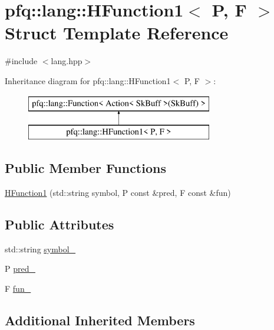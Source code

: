 \hypertarget{structpfq_1_1lang_1_1HFunction1}{\section{pfq\+:\+:lang\+:\+:H\+Function1$<$ P, F $>$ Struct Template Reference}
\label{structpfq_1_1lang_1_1HFunction1}
}


{\ttfamily \#include $<$lang.\+hpp$>$}

Inheritance diagram for pfq\+:\+:lang\+:\+:H\+Function1$<$ P, F $>$\+:\begin{figure}[H]
\begin{center}
\leavevmode
\includegraphics[height=2.000000cm]{structpfq_1_1lang_1_1HFunction1}
\end{center}
\end{figure}
\subsection*{Public Member Functions}
\begin{DoxyCompactItemize}
\item 
\hyperlink{structpfq_1_1lang_1_1HFunction1_aad645822e3a79a69665cd33c663c038d}{H\+Function1} (std\+::string symbol, P const \&pred, F const \&fun)
\end{DoxyCompactItemize}
\subsection*{Public Attributes}
\begin{DoxyCompactItemize}
\item 
std\+::string \hyperlink{structpfq_1_1lang_1_1HFunction1_a4e934ec3ab5d867ade09b56bfd81b2ab}{symbol\+\_\+}
\item 
P \hyperlink{structpfq_1_1lang_1_1HFunction1_ac0747a1da657d3b4a43bef6d8b67307c}{pred\+\_\+}
\item 
F \hyperlink{structpfq_1_1lang_1_1HFunction1_ac06d15b850523c9d36421fa76d862b9e}{fun\+\_\+}
\end{DoxyCompactItemize}
\subsection*{Additional Inherited Members}


